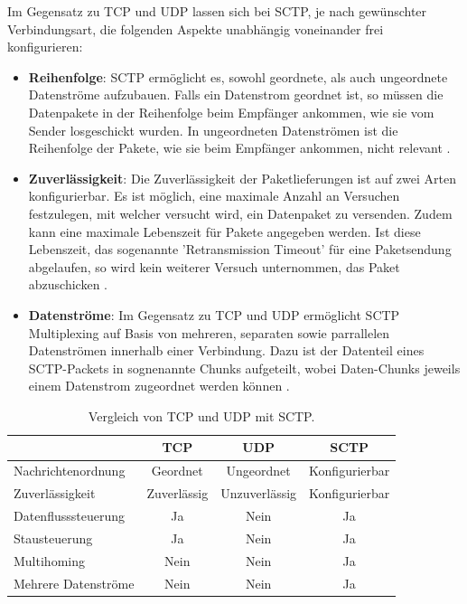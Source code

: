 Im Gegensatz zu \acs{TCP} und \acs{UDP} lassen sich bei \acs{SCTP}, je nach gewünschter Verbindungsart, die folgenden Aspekte unabhängig voneinander frei konfigurieren:
\begin{itemize}
	\item\textbf{Reihenfolge}: \acs{SCTP} ermöglicht es, sowohl geordnete, als auch ungeordnete Datenströme aufzubauen. Falls ein Datenstrom geordnet ist, so müssen die Datenpakete in der Reihenfolge beim Empfänger ankommen, wie sie vom Sender losgeschickt wurden. In ungeordneten Datenströmen ist die Reihenfolge der Pakete, wie sie beim Empfänger ankommen, nicht relevant \cite{sctpRFC}.
	\item\textbf{Zuverlässigkeit}: Die Zuverlässigkeit der Paketlieferungen ist auf zwei Arten konfigurierbar. Es ist möglich, eine maximale Anzahl an Versuchen festzulegen, mit welcher versucht wird, ein Datenpaket zu versenden. Zudem kann eine maximale Lebenszeit für Pakete angegeben werden. Ist diese Lebenszeit, das sogenannte 'Retransmission Timeout' für eine Paketsendung abgelaufen, so wird kein weiterer Versuch unternommen, das Paket abzuschicken \cite{sctpRFC}.
	\item\textbf{Datenströme}: Im Gegensatz zu \acs{TCP} und \acs{UDP} ermöglicht \acs{SCTP} Multiplexing auf Basis von mehreren, separaten sowie parrallelen Datenströmen innerhalb einer Verbindung. Dazu ist der Datenteil eines \acs{SCTP}-Packets in sognenannte \glqq{}Chunks\grqq{}  aufgeteilt, wobei Daten-Chunks jeweils einem Datenstrom zugeordnet werden können \cite{sctpRFC}.
\end{itemize}

\vspace{11pt}

\begin{table}[ht]
\centering
\begin{tabular}[t]{lccc}
\toprule
&TCP&UDP&SCTP\\
\midrule
Nachrichtenordnung&Geordnet&Ungeordnet&Konfigurierbar\\
Zuverlässigkeit&Zuverlässig&Unzuverlässig&Konfigurierbar\\
Datenflusssteuerung&Ja&Nein&Ja\\
Stausteuerung &Ja&Nein&Ja\\
Multihoming&Nein&Nein&Ja\\
Mehrere Datenströme&Nein&Nein&Ja\\
\bottomrule
\end{tabular}
\caption{Vergleich von \acs{TCP} und \acs{UDP} mit \acs{SCTP}.}
\label{table:vergleichNetzwerkProtokolle}
\end{table}

